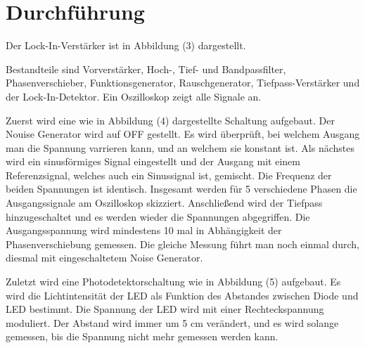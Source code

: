 \section{Durchführung}
\label{sec:Durchführung}

Der Lock-In-Verstärker ist in Abbildung (3) dargestellt.

\noindent Bestandteile sind Vorverstärker, Hoch-, Tief- und Bandpassfilter, Phasenverschieber, Funktionsgenerator, Rauschgenerator, Tiefpass-Verstärker und der Lock-In-Detektor.
Ein Oszilloskop zeigt alle Signale an. 

\noindent Zuerst wird eine wie in Abbildung (4) dargestellte Schaltung aufgebaut. Der Nouise Generator wird auf OFF gestellt.
Es wird überprüft, bei welchem Ausgang man die Spannung varrieren kann, und an welchem sie konstant ist.
Als nächstes wird ein sinusförmiges Signal eingestellt und der Ausgang mit einem Referenzsignal, welches auch ein Sinussignal ist, gemischt.
Die Frequenz der beiden Spannungen ist identisch. Insgesamt werden für 5 verschiedene Phasen die Ausgangssignale am Oszilloskop skizziert.
Anschließend wird der Tiefpass hinzugeschaltet und es werden wieder die Spannungen abgegriffen.
Die Ausgangsspannung wird mindestens 10 mal in Abhängigkeit der Phasenverschiebung gemessen.
Die gleiche Messung führt man noch einmal durch, diesmal mit eingeschaltetem Noise Generator.

\noindent Zuletzt wird eine Photodetektorschaltung wie in Abbildung (5) aufgebaut. 
Es wird die Lichtintensität der LED als Funktion des Abstandes zwischen Diode und LED bestimmt. 
Die Spannung der LED wird mit einer Rechteckspannung moduliert.
Der Abstand wird immer um 5 cm verändert, und es wird solange gemessen, bis die Spannung nicht mehr gemessen werden kann.
